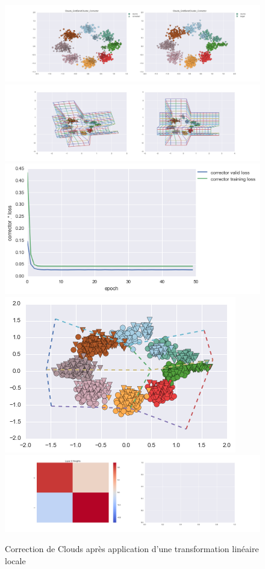\begin{figure}[H] %
\centering
\includegraphics[width=\linewidth]{fig/24-05-2016/clouds/Clouds_GridBendCluster_Corrector-DATA.png}
\includegraphics[width=\linewidth]{fig/24-05-2016/clouds/Clouds_GridBendCluster_Corrector-GridCheck.png}
\includegraphics[width=0.45\linewidth]{fig/24-05-2016/clouds/Clouds_GridBendCluster_Corrector-Learning_curve.png}
\includegraphics[width=0.45\linewidth]{fig/24-05-2016/clouds/cloud_grid.png}
\includegraphics[width=\linewidth]{fig/24-05-2016/clouds/Clouds_GridBendCluster_Corrector-W.png}
\caption{Correction de Clouds après application d'une transformation linéaire locale}
\label{fig:recap-clouds-GridBend-cluster}
\end{figure}


